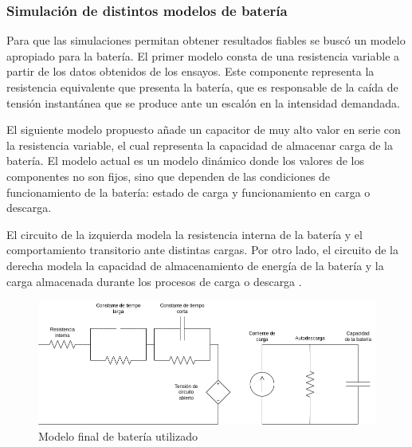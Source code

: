 







\subsubsection{Simulación de distintos modelos de batería}
Para que las simulaciones permitan obtener resultados fiables se buscó un modelo apropiado para la batería.
El primer modelo consta de una resistencia variable a partir de los datos obtenidos de los ensayos. 
Este componente representa la resistencia equivalente que presenta la batería,
que es responsable de la caída de tensión instantánea que se produce ante un escalón en la intensidad demandada.

El siguiente modelo propuesto añade un capacitor de muy alto valor en serie con la resistencia variable,
el cual representa la capacidad de almacenar carga de la batería.
El modelo actual es un modelo dinámico donde los valores de los componentes no son fijos,
sino que dependen de las condiciones de funcionamiento de la batería: estado de carga y funcionamiento en carga o descarga.

El circuito de la izquierda modela la resistencia interna de la batería y el comportamiento transitorio ante distintas cargas.
Por otro lado, el circuito de la derecha modela la capacidad de almacenamiento de energía de la batería y la carga almacenada durante los procesos de carga o descarga \cite{modelo_bateria_1}.

\begin{figure}
    \centering
    \includegraphics[width=\textwidth]{images/modelo_bateria.png}
    \caption{Modelo final de batería utilizado}
    \label{fig:bateria_3}
\end{figure}


